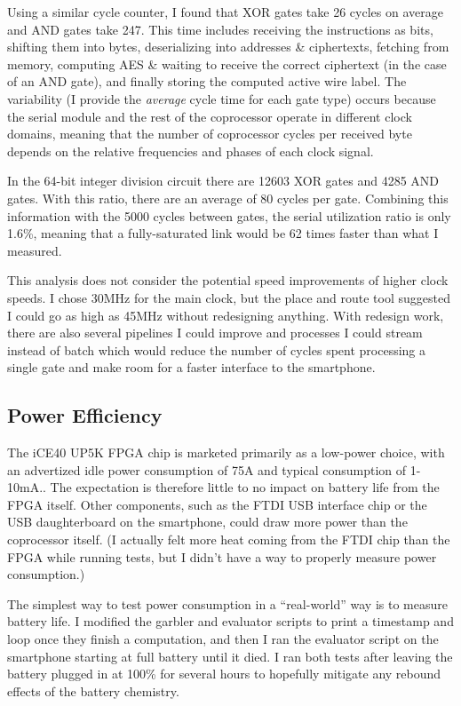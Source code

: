 Using a similar cycle counter, I found that XOR gates take 26 cycles on average and AND gates take 247. This time includes receiving the instructions as bits, shifting them into bytes, deserializing into addresses \& ciphertexts, fetching from memory, computing AES \& waiting to receive the correct ciphertext (in the case of an AND gate), and finally storing the computed active wire label. The variability (I provide the \textit{average} cycle time for each gate type) occurs
because the serial module and the rest of the coprocessor operate in different clock domains, meaning that the number of coprocessor cycles per received byte depends on the relative frequencies and phases of each clock signal.

In the 64-bit integer division circuit\cite{bristol} there are 12603 XOR gates and 4285 AND gates. With this ratio, there are an average of 80 cycles per gate. Combining this information with the 5000 cycles between gates, the serial utilization ratio is only 1.6\%, meaning that a fully-saturated link would be 62 times faster than what I measured.

This analysis does not consider the potential speed improvements of higher clock speeds. I chose 30MHz for the main clock, but the place and route tool suggested I could go as high as 45MHz without redesigning anything. With redesign work, there are also several pipelines I could improve and processes I could stream instead of batch which would reduce the number of cycles spent processing a single gate and make room for a faster interface to the smartphone.


\subsection{Power Efficiency}
The iCE40 UP5K FPGA chip is marketed primarily as a low-power choice, with an advertized idle power consumption of 75\textmu{}A and typical consumption of 1-10mA.\cite{LatticePage}. The expectation is therefore little to no impact on battery life from the FPGA itself. Other components, such as the FTDI USB interface chip or the USB daughterboard on the smartphone, could draw more power than the coprocessor itself. (I actually felt more heat coming from the FTDI chip than the FPGA while running tests, but I didn't have a way to properly measure power consumption.)

The simplest way to test power consumption in a ``real-world'' way is to measure battery life. I modified the garbler and evaluator scripts to print a timestamp and loop once they finish a computation, and then I ran the evaluator script on the smartphone starting at full battery until it died. I ran both tests after leaving the battery plugged in at 100\% for several hours to hopefully mitigate any rebound effects of the battery chemistry.

